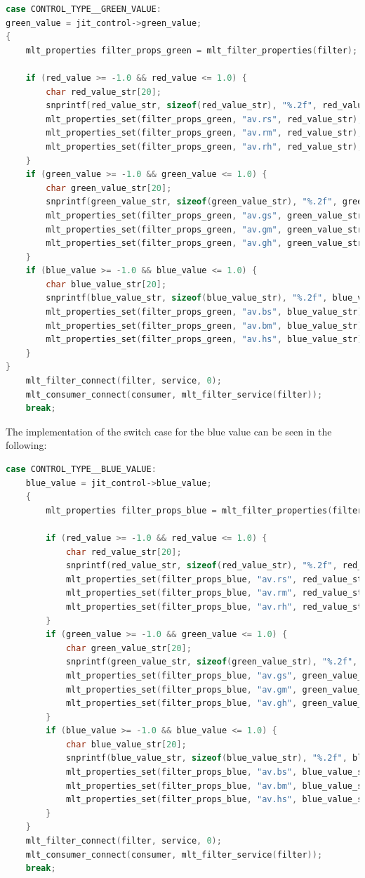 \documentclass[../MasterThesis.tex]{subfiles}
\begin{document}
\begin{lstlisting}[language=c, numbers=none, columns=fullflexible]
case CONTROL_TYPE__GREEN_VALUE:
green_value = jit_control->green_value;
{
	mlt_properties filter_props_green = mlt_filter_properties(filter);
	
	if (red_value >= -1.0 && red_value <= 1.0) {
		char red_value_str[20]; 
		snprintf(red_value_str, sizeof(red_value_str), "%.2f", red_value);
		mlt_properties_set(filter_props_green, "av.rs", red_value_str);
		mlt_properties_set(filter_props_green, "av.rm", red_value_str);
		mlt_properties_set(filter_props_green, "av.rh", red_value_str);
	}	
	if (green_value >= -1.0 && green_value <= 1.0) {
		char green_value_str[20]; 
		snprintf(green_value_str, sizeof(green_value_str), "%.2f", green_value);
		mlt_properties_set(filter_props_green, "av.gs", green_value_str);
		mlt_properties_set(filter_props_green, "av.gm", green_value_str);
		mlt_properties_set(filter_props_green, "av.gh", green_value_str);
	}		
	if (blue_value >= -1.0 && blue_value <= 1.0) {
		char blue_value_str[20]; 
		snprintf(blue_value_str, sizeof(blue_value_str), "%.2f", blue_value);
		mlt_properties_set(filter_props_green, "av.bs", blue_value_str);
		mlt_properties_set(filter_props_green, "av.bm", blue_value_str);
		mlt_properties_set(filter_props_green, "av.hs", blue_value_str);
	}		
}	
	mlt_filter_connect(filter, service, 0);
	mlt_consumer_connect(consumer, mlt_filter_service(filter));
	break;

\end{lstlisting}

The implementation of the switch case for the blue value can be seen in the following:

\begin{lstlisting}[language=c, numbers=none, columns=fullflexible]	
case CONTROL_TYPE__BLUE_VALUE:
	blue_value = jit_control->blue_value;
	{
		mlt_properties filter_props_blue = mlt_filter_properties(filter);
		
		if (red_value >= -1.0 && red_value <= 1.0) {
			char red_value_str[20]; 
			snprintf(red_value_str, sizeof(red_value_str), "%.2f", red_value);
			mlt_properties_set(filter_props_blue, "av.rs", red_value_str);
			mlt_properties_set(filter_props_blue, "av.rm", red_value_str);
			mlt_properties_set(filter_props_blue, "av.rh", red_value_str);
		}	
		if (green_value >= -1.0 && green_value <= 1.0) {
			char green_value_str[20]; 
			snprintf(green_value_str, sizeof(green_value_str), "%.2f", green_value);
			mlt_properties_set(filter_props_blue, "av.gs", green_value_str);
			mlt_properties_set(filter_props_blue, "av.gm", green_value_str);
			mlt_properties_set(filter_props_blue, "av.gh", green_value_str);
		}	
		if (blue_value >= -1.0 && blue_value <= 1.0) {
			char blue_value_str[20]; 
			snprintf(blue_value_str, sizeof(blue_value_str), "%.2f", blue_value);
			mlt_properties_set(filter_props_blue, "av.bs", blue_value_str);
			mlt_properties_set(filter_props_blue, "av.bm", blue_value_str);
			mlt_properties_set(filter_props_blue, "av.hs", blue_value_str);
		}	
	}
	mlt_filter_connect(filter, service, 0);
	mlt_consumer_connect(consumer, mlt_filter_service(filter));
	break;  

\end{lstlisting}



	
	
	
\end{document}
